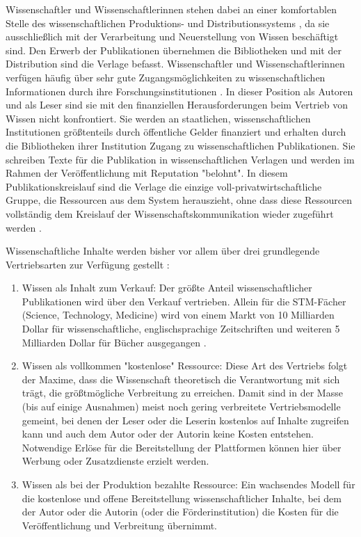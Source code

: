 Wissenschaftler und Wissenschaftlerinnen stehen dabei an einer komfortablen Stelle des wissenschaftlichen Produktions- und Distributionssystems \cite{Herb_2010}, da sie ausschließlich mit der Verarbeitung und Neuerstellung von Wissen beschäftigt sind. Den Erwerb der Publikationen übernehmen die Bibliotheken und mit der Distribution sind die Verlage befasst. Wissenschaftler und Wissenschaftlerinnen verfügen häufig über sehr gute Zugangsmöglichkeiten zu wissenschaftlichen Informationen durch ihre Forschungsinstitutionen \cite{Cope_2014}. In dieser Position als Autoren und als Leser sind sie mit den finanziellen Herausforderungen beim Vertrieb von Wissen nicht konfrontiert. Sie werden an staatlichen, wissenschaftlichen Institutionen größtenteils durch öffentliche Gelder finanziert und erhalten durch die Bibliotheken ihrer Institution Zugang zu wissenschaftlichen Publikationen. Sie schreiben Texte für die Publikation in wissenschaftlichen Verlagen und werden im Rahmen der Veröffentlichung mit Reputation "belohnt". In diesem Publikationskreislauf sind die Verlage die einzige voll-privatwirtschaftliche Gruppe, die Ressourcen aus dem System herauszieht, ohne dass diese Ressourcen vollständig dem Kreislauf der Wissenschaftskommunikation wieder zugeführt werden \cite{Kiley_2006}.

Wissenschaftliche Inhalte werden bisher vor allem über drei grundlegende Vertriebsarten zur Verfügung gestellt \cite{Cope_2014}:
\begin{enumerate}
\item Wissen als Inhalt zum Verkauf: Der größte Anteil wissenschaftlicher Publikationen wird über den Verkauf vertrieben. Allein für die STM-Fächer (Science, Technology, Medicine) wird von einem Markt von 10 Milliarden Dollar für wissenschaftliche, englischsprachige Zeitschriften und weiteren 5 Milliarden Dollar für Bücher ausgegangen \cite[:6]{Ware_2015}.
\item Wissen als vollkommen "kostenlose" Ressource: Diese Art des Vertriebs folgt der Maxime, dass die Wissenschaft theoretisch die Verantwortung mit sich trägt, die größtmögliche Verbreitung zu erreichen. Damit sind in der Masse (bis auf einige Ausnahmen) meist noch gering verbreitete Vertriebsmodelle gemeint, bei denen der Leser oder die Leserin kostenlos auf Inhalte zugreifen kann und auch dem Autor oder der Autorin keine Kosten entstehen. Notwendige Erlöse für die Bereitstellung der Plattformen können hier über Werbung oder Zusatzdienste erzielt werden.
\item Wissen als bei der Produktion bezahlte Ressource: Ein wachsendes Modell für die kostenlose und offene Bereitstellung wissenschaftlicher Inhalte, bei dem der Autor oder die Autorin (oder die Förderinstitution) die Kosten für die Veröffentlichung und Verbreitung übernimmt.
\end{enumerate}

